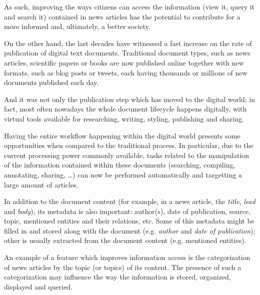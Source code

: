 \documentclass[conference]{IEEEtran}
\begin{document}
As such, improving the ways citizens can access the information (view
it, query it and search it) contained in news articles has the
potential to contribute for a more informed and, ultimately, a
better society\cite{bollinger1988tolerant}.

On the other hand, the last decades have witnessed a fast increase on
the rate of publication of digital text documents. Traditional
document types, such as news articles, scientific papers or books are
now published online together with new formats, such as blog posts or
tweets, each having thousands or millions of new documents published
each day\cite{hilbert2011world,allan2006online}.

And it was not only the publication step which has moved to the
digital world; in fact, most often nowadays the whole document
lifecycle happens digitally, with virtual tools available for
researching, writing, styling, publishing and sharing\cite{williams2009personal}.

Having the entire workflow happening within the digital world presents
some opportunities when compared to the traditional
process\cite{o1997comparison}. In particular, due to the current
processing power commonly available, tasks related to the manipulation
of the information contained within these documents (searching,
compiling, annotating, sharing, \dots) can now be performed
automatically and targetting a large amount of articles.

In addition to the document content (for example, in a news article,
the \emph{title}, \emph{lead} and \emph{body}), its metadata is also
important: author(s), date of publication, source, topic, mentioned
entities and their relations, etc. Some of this metadata might be
filled in and stored along with the document (e.g. \emph{author} and
\emph{date of publication}); other is usually extracted from the
document content (e.g. mentioned entities).

An example of a feature which improves information access is the
categorization of news articles by the topic (or topics) of its
content\cite{kim2006extracting}. The presence of such a categorization
may influence the way the information is stored, organized, displayed
and queried.
\end{document}
